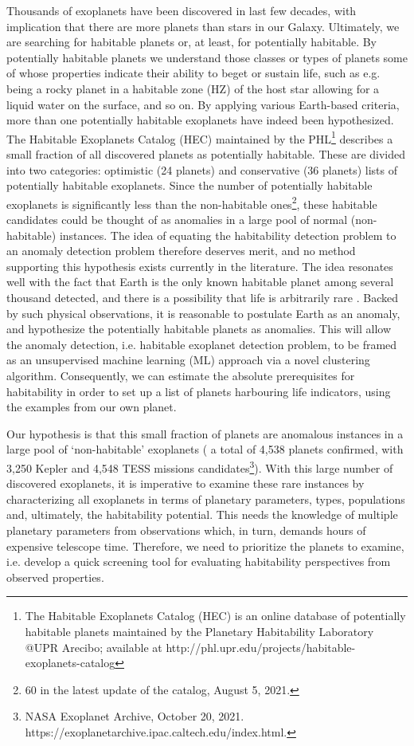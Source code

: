 \documentclass[fleqn,usenatbib]{mnras}
\begin{document}
Thousands of exoplanets have been discovered in last few decades, with implication that there are more planets than stars in our Galaxy. Ultimately, we are searching for habitable planets or, at least, for potentially habitable. By potentially habitable planets we understand those classes or types of planets some of whose properties indicate their ability to beget or sustain life, such as e.g. being a rocky planet in a habitable zone (HZ) of the host star allowing for a liquid water on the surface, and so on. By applying various Earth-based criteria, more than one potentially habitable exoplanets have indeed been hypothesized. The Habitable Exoplanets Catalog (HEC) maintained by the PHL\footnote{The Habitable Exoplanets Catalog (HEC) is an online database of potentially habitable planets maintained by the Planetary Habitability Laboratory @UPR Arecibo; available at http://phl.upr.edu/projects/habitable-exoplanets-catalog} describes a small fraction of all discovered planets as potentially habitable. These are divided into two categories: optimistic (24 planets) and conservative (36 planets) lists of potentially habitable exoplanets. Since the number of potentially habitable exoplanets is significantly less than the non-habitable ones\footnote{60 in the latest update of the catalog, August 5, 2021.}, these habitable candidates could be thought of as anomalies in a large pool of normal (non-habitable) instances. The idea of equating the habitability detection problem to an anomaly detection problem therefore deserves merit, and no method supporting this hypothesis exists currently in the literature. The idea resonates well with the fact that Earth is the only known habitable planet among several thousand detected, and there is a possibility that life is arbitrarily rare \citep{rarelife}. Backed by such physical observations, it is reasonable to postulate Earth as an anomaly, and hypothesize the potentially habitable planets as anomalies. This will allow the anomaly detection, i.e. habitable exoplanet detection problem, to be framed as an unsupervised machine learning (ML) approach via a novel clustering algorithm. Consequently, we can estimate the absolute prerequisites for habitability in order to set up a list of planets harbouring life indicators, using the examples from our own planet.

Our hypothesis is that this small fraction of planets are anomalous instances in a large pool of `non-habitable' exoplanets ( a total of 4,538 planets confirmed, with 3,250 Kepler and 4,548 TESS missions candidates\footnote{NASA Exoplanet Archive, October 20, 2021. https://exoplanetarchive.ipac.caltech.edu/index.html.}). With this large number of discovered exoplanets, it is imperative to examine these rare instances by characterizing all exoplanets in terms of planetary parameters, types, populations and, ultimately, the habitability potential. This needs the knowledge of multiple planetary parameters from observations which, in turn, demands hours of expensive telescope time. Therefore, we need to prioritize the planets to examine, i.e. develop a quick screening tool for evaluating habitability perspectives from observed properties.
\end{document}
